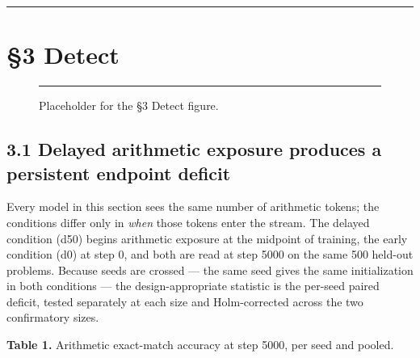 \documentclass{article}
\begin{document}
\begin{center}\rule{0.5\linewidth}{0.5pt}\end{center}

\section{§3 Detect}\label{detect}

\begin{figure}[t]
\centering
\rule{\linewidth}{0.373\textheight}
\caption{Placeholder for the §3 Detect figure.}
\end{figure}

\subsection{3.1 Delayed arithmetic exposure produces a persistent endpoint deficit}\label{delayed-arithmetic-exposure-produces-a-persistent-endpoint-deficit}

Every model in this section sees the same number of arithmetic tokens; the conditions
differ only in \emph{when} those tokens enter the stream. The delayed condition (d50) begins
arithmetic exposure at the midpoint of training, the early condition (d0) at step 0, and
both are read at step 5000 on the same 500 held-out problems. Because seeds are crossed ---
the same seed gives the same initialization in both conditions --- the design-appropriate
statistic is the per-seed paired deficit, tested separately at each size and Holm-corrected
across the two confirmatory sizes.

\textbf{Table 1.} Arithmetic exact-match accuracy at step 5000, per seed and pooled.
\end{document}

